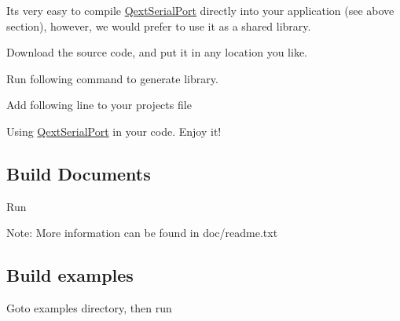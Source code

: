 It\textquotesingle{}s very easy to compile \mbox{\hyperlink{class_qext_serial_port}{Qext\+Serial\+Port}} directly into your application (see above section), however, we would prefer to use it as a shared library.


\begin{DoxyItemize}
\item Download the source code, and put it in any location you like.
\item Run following command to generate library.
\end{DoxyItemize}


\begin{DoxyCode}{0}
\end{DoxyCode}



\begin{DoxyItemize}
\item Add following line to your project\textquotesingle{}s file
\end{DoxyItemize}


\begin{DoxyCode}{0}
\end{DoxyCode}



\begin{DoxyItemize}
\item Using \mbox{\hyperlink{class_qext_serial_port}{Qext\+Serial\+Port}} in your code. Enjoy it!
\end{DoxyItemize}


\begin{DoxyCode}{0}
\end{DoxyCode}


\subsection*{Build Documents}


\begin{DoxyItemize}
\item Run 
\begin{DoxyCode}{0}
\end{DoxyCode}

\item Note\+: More information can be found in doc/readme.\+txt
\end{DoxyItemize}

\subsection*{Build examples}


\begin{DoxyItemize}
\item Goto examples directory, then run
\end{DoxyItemize}


\begin{DoxyCode}{0}
\end{DoxyCode}
 